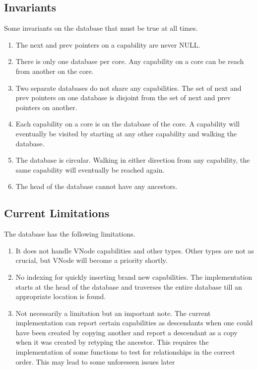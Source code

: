 \documentclass[a4paper,11pt,twoside]{report}
\begin{document}
\subsection{Invariants}

Some invariants on the database that must be true at all times.
\begin{enumerate}
\item The next and prev pointers on a capability are never NULL.
\item There is only one database per core.
Any capability on a core can be reach from another on the core.
\item Two separate databases do not share any capabilities.
The set of next and prev pointers on one database
is disjoint from the set of next and prev pointers on another.
\item Each capability on a core is on the database of the core.
A capability will eventually be visited by starting at any other capability
and walking the database.
\item The database is circular.
Walking in either direction from any capability,
the same capability will eventually be reached again.
\item The head of the database cannot have any ancestors.
\end{enumerate}

\subsection{Current Limitations}

The database has the following limitations.
\begin{enumerate}
\item It does not handle VNode capabilities and other types.
Other types are not as crucial, but VNode will become a priority shortly.

\item No indexing for quickly inserting brand new capabilities.
The implementation starts at the head of the database
and traverses the entire database till an appropriate location is found.

\item Not necessarily a limitation but an important note.
The current implementation can report certain capabilities as descendants
when one could have been created by copying another
and report a descendant as a copy when it was created by retyping the ancestor.
This requires the implementation of some functions to test for relationships
in the correct order.
This may lead to some unforeseen issues later
\end{enumerate}
\end{document}
